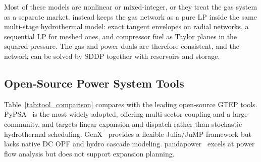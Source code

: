 Most of these models are nonlinear or mixed-integer, or they treat the
gas system as a separate market.  \gtopt{} instead keeps the gas
network as a pure LP inside the same multi-stage hydrothermal model:
exact tangent envelopes on radial networks, a sequential LP for meshed
ones, and compressor fuel as Taylor planes in the squared pressure.
The gas and power duals are therefore consistent, and the network can
be solved by SDDP together with reservoirs and storage.

\subsection{Open-Source Power System Tools}

Table~\ref{tab:tool_comparison} compares \gtopt{} with the leading
open-source GTEP tools.  PyPSA~\cite{brown2018pypsa} is the most widely
adopted, offering multi-sector coupling and a large community, and
targets linear expansion and dispatch rather than stochastic
hydrothermal scheduling.
GenX~\cite{jenkins2017genx} provides a flexible Julia/JuMP framework but
lacks native DC OPF and hydro cascade modeling.  pandapower~\cite{thurner2018pandapower}
excels at power flow analysis but does not support expansion planning.

